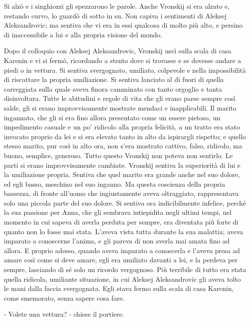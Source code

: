 Si alzò e i singhiozzi gli spezzarono le parole. Anche Vronskij si era alzato e, restando curvo, lo guardò di sotto in su. Non capiva i sentimenti di Aleksej Aleksandrovic; ma sentiva che vi era in essi qualcosa di molto più alto, e persino di inaccessibile a lui e alla propria visione del mondo. 

Dopo il colloquio con Aleksej Aleksandrovic, Vronskij uscì sulla scala di casa Karenin e vi si fermò, ricordando a stento dove si trovasse e se dovesse andare a piedi o in vettura. Si sentiva svergognato, umiliato, colpevole e nella impossibilità di riscattare la propria umiliazione. Si sentiva lanciato al di fuori di quella carreggiata sulla quale aveva finora camminato con tanto orgoglio e tanta disinvoltura. Tutte le abitudini e regole di vita che gli erano parse sempre così salde, gli si erano improvvisamente mostrate mendaci e inapplicabili. Il marito ingannato, che gli si era fino allora presentato come un essere pietoso, un impedimento casuale e un po' ridicolo alla propria felicità, a un tratto era stato invocato proprio da lei e si era elevato tanto in alto da ispirargli rispetto; e quello stesso marito, pur così in alto ora, non s'era mostrato cattivo, falso, ridicolo, ma buono, semplice, generoso. Tutto questo Vronskij non poteva non sentirlo. Le parti si erano improvvisamente cambiate. Vronskij sentiva la superiorità di lui e la umiliazione propria. Sentiva che quel marito era grande anche nel suo dolore, ed egli basso, meschino nel suo inganno. Ma questa coscienza della propria bassezza, di fronte all'uomo che ingiustamente aveva oltraggiato, rappresentava solo una piccola parte del suo dolore. Si sentiva ora indicibilmente infelice, perché la sua passione per Anna, che gli sembrava intiepidita negli ultimi tempi, nel momento in cui sapeva di averla perduta per sempre, era diventata più forte di quanto non lo fosse mai stata. L'aveva vista tutta durante la sua malattia; aveva imparato a conoscerne l'anima, e gli pareva di non averla mai amata fino ad allora. E proprio adesso, quando aveva imparato a conoscerla e l'aveva presa ad amare così come si deve amare, egli era umiliato davanti a lei, e la perdeva per sempre, lasciando di sé solo un ricordo vergognoso. Più terribile di tutto era stata quella ridicola, umiliante situazione, in cui Aleksej Aleksandrovic gli aveva tolto le mani dalla faccia svergognata. Egli stava fermo sulla scala di casa Karenin, come smemorato, senza sapere cosa fare. 

- Volete una vettura? - chiese il portiere. 

